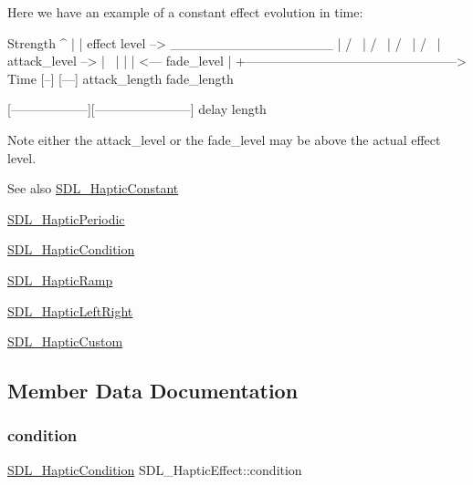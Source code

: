 Here we have an example of a constant effect evolution in time\+: \begin{DoxyVerb}Strength
^
|
|    effect level -->  _________________
|                     /                 \
|                    /                   \
|                   /                     \
|                  /                       \
| attack_level --> |                        \
|                  |                        |  <---  fade_level
|
+--------------------------------------------------> Time
                   [--]                 [---]
                   attack_length        fade_length

[------------------][-----------------------]
delay               length
\end{DoxyVerb}


Note either the attack\+\_\+level or the fade\+\_\+level may be above the actual effect level.

\begin{DoxySeeAlso}{See also}
\hyperlink{structSDL__HapticConstant}{S\+D\+L\+\_\+\+Haptic\+Constant} 

\hyperlink{structSDL__HapticPeriodic}{S\+D\+L\+\_\+\+Haptic\+Periodic} 

\hyperlink{structSDL__HapticCondition}{S\+D\+L\+\_\+\+Haptic\+Condition} 

\hyperlink{structSDL__HapticRamp}{S\+D\+L\+\_\+\+Haptic\+Ramp} 

\hyperlink{structSDL__HapticLeftRight}{S\+D\+L\+\_\+\+Haptic\+Left\+Right} 

\hyperlink{structSDL__HapticCustom}{S\+D\+L\+\_\+\+Haptic\+Custom} 
\end{DoxySeeAlso}


\subsection{Member Data Documentation}
\mbox{\label{unionSDL__HapticEffect_aa8fdd1ba202ccd7e61f48ef9977080d2}} 
\subsubsection{\texorpdfstring{condition}{condition}}
{\footnotesize\ttfamily \hyperlink{structSDL__HapticCondition}{S\+D\+L\+\_\+\+Haptic\+Condition} S\+D\+L\+\_\+\+Haptic\+Effect\+::condition}

